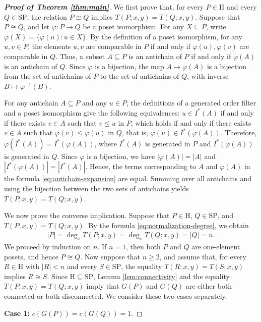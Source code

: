 \documentclass[11pt,a4paper]{article}
\begin{document}
\begin{proof}[\rm\textbf{Proof of Theorem \ref{thm:main}}]
We first prove that, for every $P\in\mathrm H$ and every
$Q\in\mathrm{SP}$, the relation $P\cong Q$ implies $T(P;x,y)=T(Q;x,y)$.
Suppose that $P\cong Q$, and let $\varphi:P\to Q$ be a poset isomorphism.
For any $X\subseteq P$, write $\varphi(X)=\{\varphi(u):u\in X\}$.
By the definition of a poset isomorphism, for any $u,v\in P$,
the elements $u,v$ are comparable in $P$ if and only if
$\varphi(u),\varphi(v)$ are comparable in $Q$.
Thus, a subset $A\subseteq P$ is an antichain of $P$ if and only if
$\varphi(A)$ is an antichain of $Q$.
Since $\varphi$ is a bijection, the map $A\mapsto\varphi(A)$
is a bijection from the set of antichains of $P$ to the set
of antichains of $Q$, with inverse $B\mapsto\varphi^{-1}(B)$.

For any antichain $A\subseteq P$ and any $u\in P$,
the definitions of a generated order filter and a poset isomorphism
give the following equivalences:
$u\in I^*(A)$ if and only if there exists $v\in A$ such that
$v\le u$ in $P$, which holds if and only if there exists $v\in A$
such that $\varphi(v)\le\varphi(u)$ in $Q$, that is, $\varphi(u)\in I^*(\varphi(A))$.
Therefore, $\varphi(I^*(A))=I^*(\varphi(A))$, where $I^*(A)$ is generated in $P$ and
$I^*(\varphi(A))$ is generated in $Q$. Since $\varphi$ is a bijection, we have
$|\varphi(A)|=|A|$ and $|I^*(\varphi(A))|=|I^*(A)|$.
Hence, the terms corresponding to $A$ and $\varphi(A)$ in the formula \eqref{eq:antichain-expansion} are equal.
Summing over all antichains and using the bijection between the two sets of antichains yields $T(P;x,y)=T(Q;x,y)$.

We now prove the converse implication.
Suppose that $P\in\mathrm H$, $Q\in\mathrm{SP}$, and $T(P;x,y)=T(Q;x,y)$.
By the formula \eqref{eq:normalization-degree}, we obtain
\begin{eqnarray*}
|P|=\deg_x T(P;x,y)=\deg_x T(Q;x,y)=|Q|=n.
\end{eqnarray*}
We proceed by induction on $n$.
If $n=1$, then both $P$ and $Q$ are one-element posets,
and hence $P\cong Q$.
Now suppose that $n\geq2$, and assume that, for every
$R\in\mathrm H$ with $|R|<n$ and every $S\in\mathrm{SP}$,
the equality $T(R;x,y)=T(S;x,y)$ implies $R\cong S$.
Since $\mathrm H\subseteq\mathrm{SP}$,
Lemma \ref{lem:connectivity} and the equality
$T(P;x,y)=T(Q;x,y)$ imply that $G(P)$ and $G(Q)$
are either both connected or both disconnected.
We consider these two cases separately.

\textbf{Case 1:} $c(G(P))=c(G(Q))=1$.


\end{proof}
\end{document}
